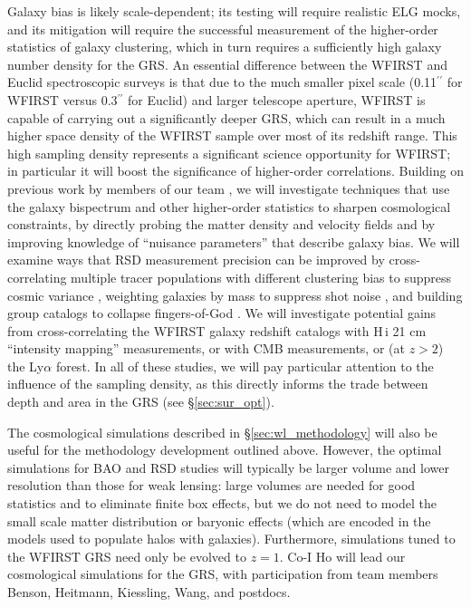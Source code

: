 Galaxy bias is likely scale-dependent; its testing will require realistic ELG mocks, and its mitigation will require
the successful measurement of the higher-order statistics of galaxy clustering, which in turn requires a
sufficiently high galaxy number density for the GRS.
An essential difference between the WFIRST and Euclid spectroscopic
surveys is that due to the much smaller pixel scale (0.11$^{\prime\prime}$ for WFIRST
versus 0.3$^{\prime\prime}$ for Euclid) and larger telescope aperture, WFIRST
is capable of carrying out a significantly deeper GRS, which can result in
a much higher space density of the WFIRST sample over most
of its redshift range.
This high sampling density represents a significant science opportunity
for WFIRST;
in particular it will boost the significance of higher-order correlations.
Building on previous work by members of our team \cite{Takada08,Schaan14,Dore14,Chen15},
we will investigate techniques that use the galaxy
bispectrum and other higher-order statistics to sharpen cosmological
constraints, by directly probing the matter density and velocity fields
and by improving knowledge of ``nuisance parameters'' that describe
galaxy bias.  We will examine ways that RSD measurement precision
can be improved by cross-correlating multiple tracer populations
with different clustering bias to suppress cosmic
variance \cite{mcDonald2009,Bernstein2011,dePutter:2014lna}, weighting galaxies by mass
to suppress shot noise \cite{Seljak2009}, and building group catalogs
to collapse fingers-of-God \cite{Reid2010}.
We will investigate potential gains from cross-correlating the
WFIRST galaxy redshift catalogs with H$\,${\sc i} 21 cm ``intensity mapping''
measurements, or with CMB measurements, or (at $z>2$) the Ly$\alpha$ forest.
In all of these studies, we will pay particular attention to
the influence of the sampling density, as this directly informs
the trade between depth and area in the GRS (see \S\ref{sec:sur_opt}).

 The cosmological simulations described in \S\ref{sec:wl_methodology}
will also be useful for the methodology development outlined above.
However, the optimal simulations for BAO and RSD studies will typically
be larger volume and lower resolution than those for weak lensing:
large volumes are needed for good statistics and to eliminate finite
box effects, but we do not need to model the small scale matter
distribution or baryonic effects (which are encoded in the
models used to populate halos with galaxies).  Furthermore,
simulations tuned to the WFIRST GRS need only be evolved to $z=1$.
Co-I Ho will lead our cosmological simulations for the GRS, with participation from
team members Benson, Heitmann, Kiessling, Wang, and postdocs.


